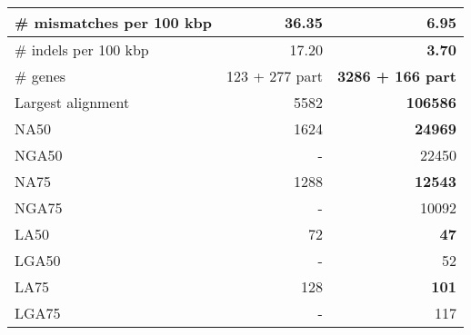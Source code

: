 \documentclass[12pt,a4paper]{article}
\begin{document}
\begin{table}[ht]
\begin{center}
\begin{tabular}{|l*{2}{|r}|}
\# mismatches per 100 kbp & 36.35 & {\bf 6.95} \\ \hline
\# indels per 100 kbp & 17.20 & {\bf 3.70} \\ \hline
\# genes & 123 + 277 part & {\bf 3286 + 166 part} \\ \hline
Largest alignment & 5582 & {\bf 106586} \\ \hline
NA50 & 1624 & {\bf 24969} \\ \hline
NGA50 & - & 22450 \\ \hline
NA75 & 1288 & {\bf 12543} \\ \hline
NGA75 & - & 10092 \\ \hline
LA50 & 72 & {\bf 47} \\ \hline
LGA50 & - & 52 \\ \hline
LA75 & 128 & {\bf 101} \\ \hline
LGA75 & - & 117 \\ \hline
\end{tabular}
\end{center}
\end{table}
\end{document}
